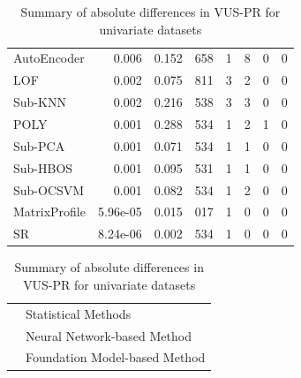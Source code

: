 \documentclass[12pt,oneside]{article}
\begin{document}
\begin{table}[htbp]
\begin{tabular}{lrrrrrrr}
        \rowcolor{myLightBlue} AutoEncoder & 0.006 & 0.152 & 658 & 1 & 8 & 0 & 0 \\
        \rowcolor{lightgray} LOF & 0.002 & 0.075 & 811 & 3 & 2 & 0 & 0 \\
        \rowcolor{lightgray} Sub-KNN & 0.002 & 0.216 & 538 & 3 & 3 & 0 & 0 \\
        \rowcolor{lightgray} POLY & 0.001 & 0.288 & 534 & 1 & 2 & 1 & 0 \\
        \rowcolor{lightgray} Sub-PCA & 0.001 & 0.071 & 534 & 1 & 1 & 0 & 0 \\
        \rowcolor{lightgray} Sub-HBOS & 0.001 & 0.095 & 531 & 1 & 1 & 0 & 0 \\
        \rowcolor{lightgray} Sub-OCSVM & 0.001 & 0.082 & 534 & 1 & 2 & 0 & 0 \\
        \rowcolor{lightgray} MatrixProfile & 5.96e-05 & 0.015 & 017 & 1 & 0 & 0 & 0 \\
        \rowcolor{lightgray} SR & 8.24e-06 & 0.002 & 534 & 1 & 0 & 0 & 0 \\
        \bottomrule
    \end{tabular}
    \par
    \vspace{1em}
    \noindent
    \begin{tabular}{@{} p{1em} l @{}}
        \rowcolor{lightgray} \strut & Statistical Methods \\
        \rowcolor{myLightBlue} \strut & Neural Network-based Method \\
        \rowcolor{myLightGreen} \strut & Foundation Model-based Method \\

    \end{tabular}
    \caption{\label{tab:Table 2} Summary of absolute differences in VUS-PR for univariate datasets}
\end{table}
\end{document}
